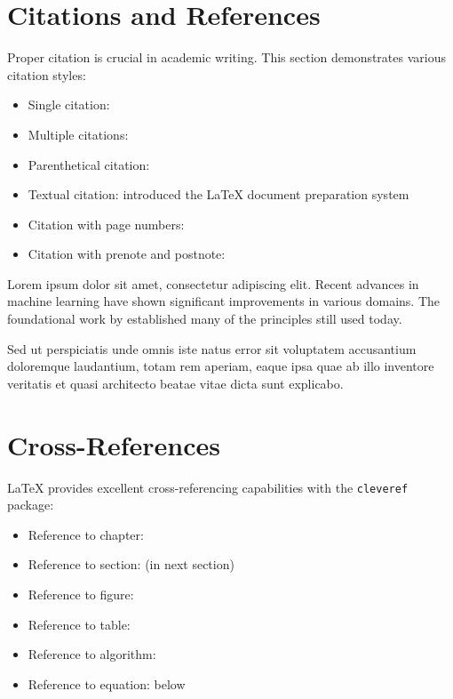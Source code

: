 \section{Citations and References}

Proper citation is crucial in academic writing. This section demonstrates various citation styles:

\begin{itemize}
\item Single citation: \cite{knuth1984texbook}
\item Multiple citations: \cite{lamport1986latex,cormen2009introduction}
\item Parenthetical citation: \citep{knuth1984texbook}
\item Textual citation: \citet{lamport1986latex} introduced the LaTeX document preparation system
\item Citation with page numbers: \citep[p.~42]{cormen2009introduction}
\item Citation with prenote and postnote: \citep[see][Chapter 3]{knuth1984texbook}
\end{itemize}

Lorem ipsum dolor sit amet, consectetur adipiscing elit. Recent advances in machine learning \citep{cormen2009introduction} have shown significant improvements in various domains. The foundational work by \citet{knuth1984texbook} established many of the principles still used today.

Sed ut perspiciatis unde omnis iste natus error sit voluptatem accusantium doloremque laudantium, totam rem aperiam, eaque ipsa quae ab illo inventore veritatis et quasi architecto beatae vitae dicta sunt explicabo.

\section{Cross-References}

LaTeX provides excellent cross-referencing capabilities with the \texttt{cleveref} package:

\begin{itemize}
\item Reference to chapter: 
\item Reference to section:  (in next section)
\item Reference to figure: 
\item Reference to table: 
\item Reference to algorithm: 
\item Reference to equation:  below
\end{itemize}

